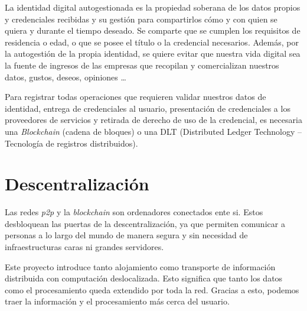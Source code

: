 La identidad digital autogestionada es la propiedad soberana de los datos propios y credenciales recibidas y su gestión para compartirlos cómo y con quien se quiera y durante el tiempo deseado. Se comparte que se cumplen los requisitos de residencia o edad, o que se posee el título o la credencial necesarios. Además, por la autogestión de la propia identidad, se quiere evitar que nuestra vida digital sea la fuente de ingresos de las empresas que recopilan y comercializan nuestros datos, gustos, deseos, opiniones \dots

Para registrar todas operaciones que requieren validar nuestros datos de identidad, entrega de credenciales al usuario, presentación de credenciales a los proveedores de servicios y retirada de derecho de uso de la credencial, es necesaria una \textit{Blockchain} (cadena de bloques) o una DLT (Distributed Ledger Technology – Tecnología de registros distribuidos).

\section{Descentralización}
Las redes \textit{p2p} \cite{web:p2p} y la \textit{blockchain} \cite{web:blockchain} son ordenadores conectados ente si. Estos desbloquean las puertas de la descentralización, ya que permiten comunicar a personas a lo largo del mundo de manera segura y sin necesidad de infraestructuras caras ni grandes servidores.

Este proyecto introduce tanto alojamiento como transporte de información distribuida con computación deslocalizada. Esto significa que tanto los datos como el procesamiento queda extendido por toda la red. Gracias a esto, podemos traer la información y el procesamiento más cerca del usuario.

